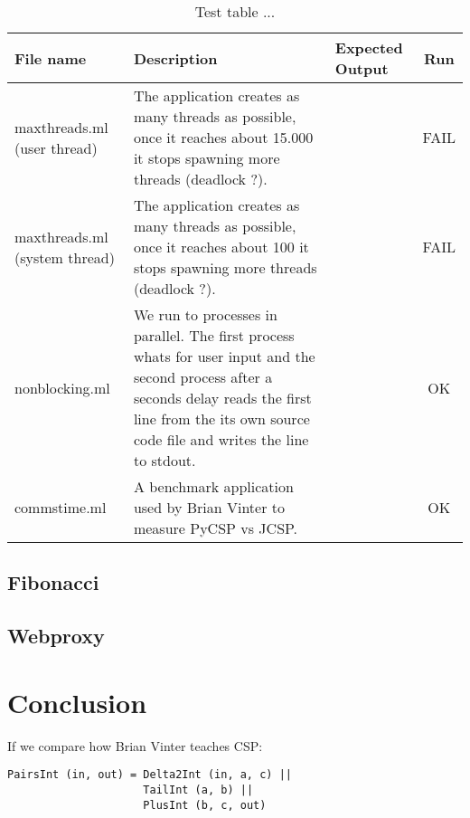 \documentclass[a4paper,12pt]{article}
\begin{document}
\label{test}
\begin{table}[!ht]
\centering
\begin{tabular}{|p{3cm}|p{4.0cm}|p{4.0cm}|c|}
    \hline
    	File name &
	Description &
	Expected Output &
	Run \\
    \hline
    	maxthreads.ml (user thread) &
        The application creates as many threads as possible, once it reaches
        about 15.000 it stops spawning more threads (deadlock ?).&
        &
	FAIL \\
    \hline
    	maxthreads.ml (system thread) &
        The application creates as many threads as possible, once it reaches
        about 100 it stops spawning more threads (deadlock ?).&
        &
	FAIL \\
    \hline
    	nonblocking.ml &
        We run to processes in parallel. The first process whats for user input
        and the second process after a seconds delay reads the first line from
        the its own source code file and writes the line to stdout.&
        &
	OK \\
    \hline
    	commstime.ml &
        A benchmark application used by Brian Vinter to measure PyCSP vs JCSP.&
        &
	OK \\
    \hline
\end{tabular} 
\caption{Test table ...}
\label{testtable}
\end{table}

\subsection{Fibonacci}


\subsection{Webproxy}


\section{Conclusion}
\label{conclusion}

If we compare how Brian Vinter teaches CSP\cite{vinter}:
\begin{center}
\begin{verbatim}
PairsInt (in, out) = Delta2Int (in, a, c) || 
                     TailInt (a, b) || 
                     PlusInt (b, c, out) 
\end{verbatim}
\end{center}
\end{document}
